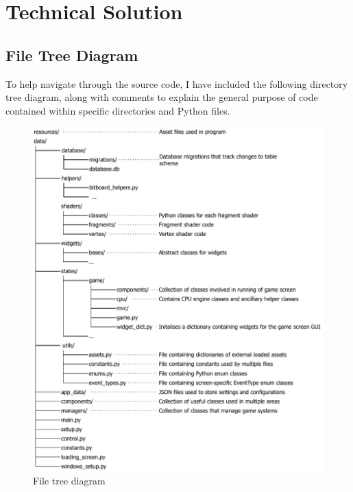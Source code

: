 \documentclass[../main/main.tex]{subfiles}
\begin{document}
\newpage

\chapter{Technical Solution}
\localtableofcontents

\section{File Tree Diagram}
To help navigate through the source code, I have included the following directory tree diagram, along with comments to explain the general purpose of code contained within specific directories and Python files.

\begin{figure}[H]
    \centering
    \includegraphics[width=\columnwidth]{../technical_solution/assets/file_tree_diagram.pdf}
    \caption{File tree diagram}
    \label{fig:file-tree-diagram}
\end{figure}
\end{document}
